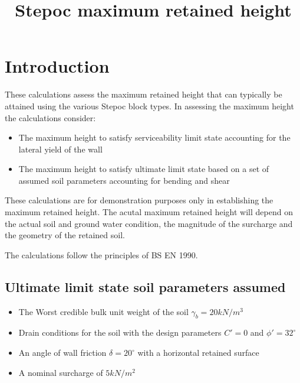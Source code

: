\documentclass[11pt]{article}
\title{Stepoc maximum retained height}
\providecommand{\tightlist}{%
      \setlength{\itemsep}{0pt}\setlength{\parskip}{0pt}}
\begin{document}
    
    \maketitle
    
    

    
    \hypertarget{introduction}{%
\section{Introduction}\label{introduction}}

These calculations assess the maximum retained height that can typically
be attained using the various Stepoc block types. In assessing the
maximum height the calculations consider:

\begin{itemize}
\tightlist
\item
  The maximum height to satisfy serviceability limit state accounting
  for the lateral yield of the wall
\item
  The maximum height to satisfy ultimate limit state based on a set of
  assumed soil parameters accounting for bending and shear
\end{itemize}

These calculations are for demonstration purposes only in establishing
the maximum retained height. The acutal maximum retained height will
depend on the actual soil and ground water condition, the magnitude of
the surcharge and the geometry of the retained soil.

The calculations follow the principles of BS EN 1990.

\hypertarget{ultimate-limit-state-soil-parameters-assumed}{%
\subsection{Ultimate limit state soil parameters
assumed}\label{ultimate-limit-state-soil-parameters-assumed}}

\begin{itemize}
\tightlist
\item
  The Worst credible bulk unit weight of the soil
  \(\gamma_b = 20 kN/m^3\)
\item
  Drain conditions for the soil with the design parameters \(C' = 0\)
  and \(\phi '= 32^{\circ}\)
\item
  An angle of wall friction \(\delta = 20^{\circ}\) with a horizontal
  retained surface
\item
  A nominal surcharge of \(5kN/m^2\)
\end{itemize}
\end{document}
